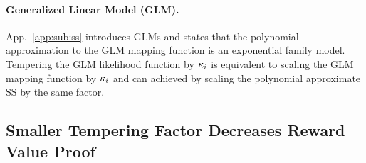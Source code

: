 \documentclass{article}
\theoremstyle{plain}
\theoremstyle{definition}
\theoremstyle{remark}
\begin{document}
\paragraph{Generalized Linear Model (GLM).}
App.~\ref{app:sub:ss} introduces GLMs and states that the polynomial approximation to the GLM mapping function is an exponential family model. Tempering the GLM likelihood function by ${\kappa_i}$ is equivalent to scaling the GLM mapping function by ${\kappa_i}$ and can achieved by scaling the polynomial approximate SS by the same factor.








\subsection{Smaller Tempering Factor Decreases Reward Value Proof}
\end{document}
